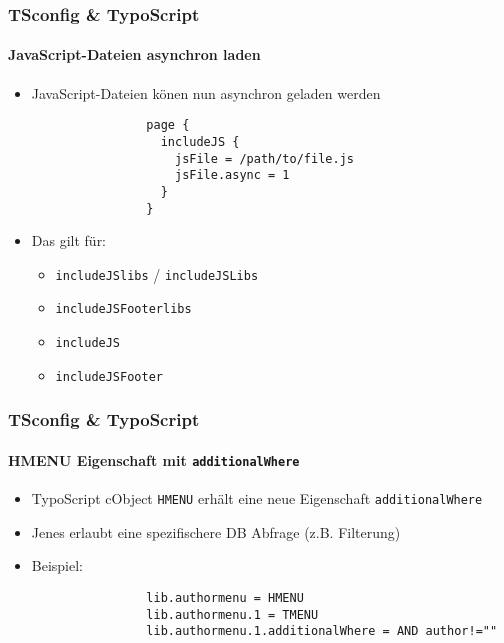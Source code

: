\begin{frame}[fragile]
	\frametitle{TSconfig \& TypoScript}
	\framesubtitle{JavaScript-Dateien asynchron laden}

	\begin{itemize}
		\item JavaScript-Dateien könen nun asynchron geladen werden

			\begin{lstlisting}
				page {
				  includeJS {
				    jsFile = /path/to/file.js
				    jsFile.async = 1
				  }
				}
			\end{lstlisting}

		\item Das gilt für:

			\begin{itemize}
				\item \texttt{includeJSlibs} / \texttt{includeJSLibs}
				\item \texttt{includeJSFooterlibs}
				\item \texttt{includeJS}
				\item \texttt{includeJSFooter}
			\end{itemize}

	\end{itemize}

\end{frame}


\begin{frame}[fragile]
	\frametitle{TSconfig \& TypoScript}
	\framesubtitle{HMENU Eigenschaft mit \texttt{additionalWhere}}

	\begin{itemize}

		\item TypoScript cObject \texttt{HMENU} erhält eine neue Eigenschaft \texttt{additionalWhere}
		\item Jenes erlaubt eine spezifischere DB Abfrage (z.B. Filterung)

		\item Beispiel:

			\begin{lstlisting}
				lib.authormenu = HMENU
				lib.authormenu.1 = TMENU
				lib.authormenu.1.additionalWhere = AND author!=""
			\end{lstlisting}

	\end{itemize}

\end{frame}

